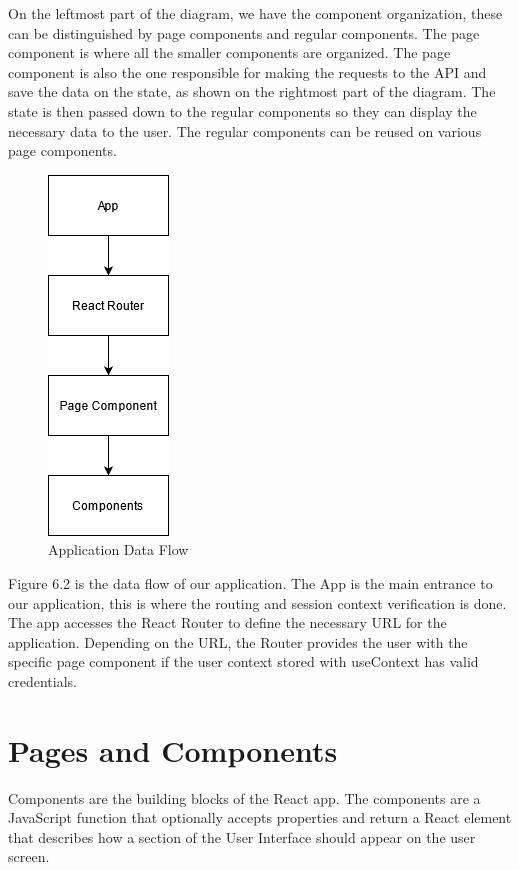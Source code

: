 \documentclass[a4paper,twoside,10pt]{report}
\begin{document}
On the leftmost part of the diagram, we have the component organization, these can be distinguished by page components and regular components.
The page component is where all the smaller components are organized. 
\newline
The page component is also the one responsible for making the requests to the API and save the data on the state, as shown on the rightmost part of the diagram.
\newline
The state is then passed down to the regular components so they can display the necessary data to the user.
The regular components can be reused on various page components.

\newpage
\begin{figure}[h!]
\center
  \includegraphics{client app interations.png}
\caption{Application Data Flow}
\end{figure}
Figure 6.2 is the data flow of our application.
The App is the main entrance to our application, this is where the routing and session context verification is done.
The app accesses the React Router to define the necessary URL for the application. Depending on the URL, the Router provides the user with the specific page component if the user context stored with useContext has valid credentials.

\section{Pages and Components}
Components are the building blocks of the React app. The components are a JavaScript function that optionally accepts properties and return a React element that describes how a section of the User Interface should appear on the user screen. 
\end{document}
